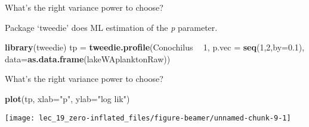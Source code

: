 \documentclass[ignorenonframetext,]{beamer}
\newenvironment{Shaded}{\begin{snugshade}}{\end{snugshade}}
\newcommand{\DataTypeTok}[1]{\textcolor[rgb]{0.13,0.29,0.53}{#1}}
\newcommand{\DecValTok}[1]{\textcolor[rgb]{0.00,0.00,0.81}{#1}}
\newcommand{\FloatTok}[1]{\textcolor[rgb]{0.00,0.00,0.81}{#1}}
\newcommand{\KeywordTok}[1]{\textcolor[rgb]{0.13,0.29,0.53}{\textbf{#1}}}
\newcommand{\NormalTok}[1]{#1}
\newcommand{\OperatorTok}[1]{\textcolor[rgb]{0.81,0.36,0.00}{\textbf{#1}}}
\newcommand{\StringTok}[1]{\textcolor[rgb]{0.31,0.60,0.02}{#1}}
\begin{document}
\begin{frame}[fragile]{What's the right variance power to choose?}
\protect\hypertarget{whats-the-right-variance-power-to-choose}{}

Package `tweedie' does ML estimation of the \emph{p} parameter.

\begin{Shaded}
\begin{Highlighting}[]
\KeywordTok{library}\NormalTok{(tweedie)}
\NormalTok{tp =}\StringTok{ }\KeywordTok{tweedie.profile}\NormalTok{(Conochilus }\OperatorTok{~}\StringTok{ }\DecValTok{1}\NormalTok{, }
  \DataTypeTok{p.vec =} \KeywordTok{seq}\NormalTok{(}\DecValTok{1}\NormalTok{,}\DecValTok{2}\NormalTok{,}\DataTypeTok{by=}\FloatTok{0.1}\NormalTok{), }
  \DataTypeTok{data=}\KeywordTok{as.data.frame}\NormalTok{(lakeWAplanktonRaw))}
\end{Highlighting}
\end{Shaded}

\end{frame}

\begin{frame}[fragile]{What's the right variance power to choose?}
\protect\hypertarget{whats-the-right-variance-power-to-choose-1}{}

\begin{Shaded}
\begin{Highlighting}[]
\KeywordTok{plot}\NormalTok{(tp, }\DataTypeTok{xlab=}\StringTok{"p"}\NormalTok{, }\DataTypeTok{ylab=}\StringTok{"log lik"}\NormalTok{)}
\end{Highlighting}
\end{Shaded}

\begin{center}\texttt{[image: lec\_19\_zero-inflated\_files/figure-beamer/unnamed-chunk-9-1]} \end{center}

\end{frame}
\end{document}

